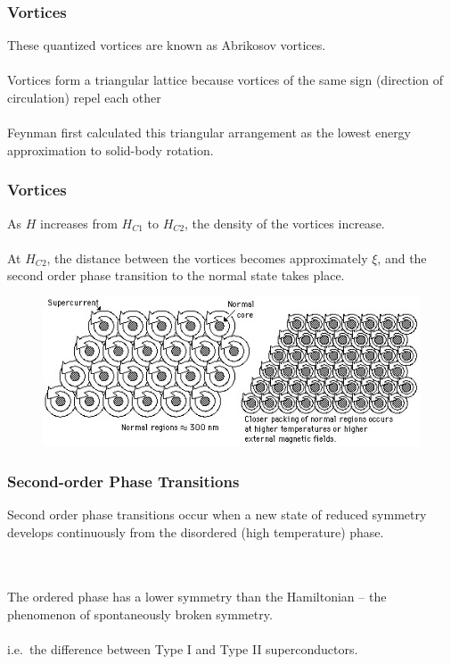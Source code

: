 \documentclass[10pt]{beamer}
\theoremstyle{definition}
\begin{document}
\begin{frame}[<+->]
    \frametitle{Vortices}

    These quantized vortices are known as Abrikosov vortices.
    \\~\\

    Vortices form a triangular lattice because vortices of the same sign 
    (direction of circulation) repel each other
    \\~\\

    Feynman first calculated this triangular arrangement as the lowest energy
    approximation to solid-body rotation.


\end{frame}

\begin{frame}
    \frametitle{Vortices}

    As $H$ increases from $H_{C1}$ to $H_{C2}$, the density of the vortices
    increase.
    \\~\\
    At $H_{C2}$, the distance between the vortices becomes approximately
    $\xi$, and the second order phase transition to the normal state takes
    place.


    \begin{figure}
    \begin{center}
        \includegraphics[scale=0.006]{svort}
    \end{center}
    \end{figure}


\end{frame}



\begin{frame}
    \frametitle{Second-order Phase Transitions}
    Second order phase transitions occur when a new state of
reduced symmetry
develops continuously from the
disordered (high temperature) phase. 

\\~\\
The ordered phase has a
lower symmetry
than the Hamiltonian -- the
phenomenon of
spontaneously broken symmetry.
\\~\\
i.e.\ the difference between Type I and Type II superconductors.

\end{frame}
\end{document}
